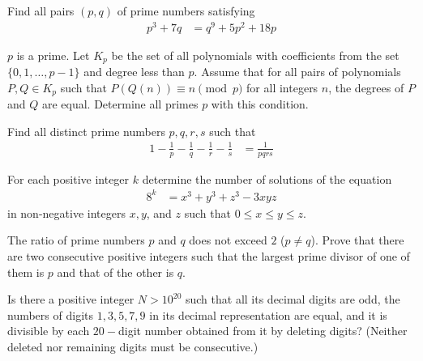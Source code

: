 \documentclass[problems.tex]{subfile}
\begin{document}
	\begin{problem}
		Find all pairs $(p, q)$ of prime numbers satisfying
			\begin{align*}
				p^3+7q
					& = q^9+5p^2+18p
			\end{align*}
	\end{problem}

	\begin{problem}
		$p$ is a prime. Let $K_p$ be the set of all polynomials with coefficients from the set $\{0,1,\dots ,p-1\}$ and degree less than $p$. Assume that for all pairs of polynomials $P,Q\in K_p$ such that $P(Q(n))\equiv n\pmod p$ for all integers $n$, the degrees of $P$ and $Q$ are equal. Determine all primes $p$ with this condition. %
	\end{problem}

	\begin{problem}
		Find all distinct prime numbers $p,q,r,s$ such that
			\begin{align*}
				1-\frac{1}{p} - \frac{1}{q} -\frac{1}{r} - \frac{1}{s}
					& =\frac{1}{pqrs}
			\end{align*}
	\end{problem}

	\begin{problem}
		For each positive integer $k$ determine the number of solutions of the equation
			\begin{align*}
				8^k
					& = x^3 + y^3 + z^3 - 3xyz
			\end{align*}
		in non-negative integers $x,y$, and $z$ such that $0 \leq x \leq y \leq z$.
	\end{problem}

	\begin{problem}
		The ratio of prime numbers $p$ and $q$ does not exceed $2$ ($p \neq q$). Prove
		that there are two consecutive positive integers such that the largest
		prime divisor of one of them is $p$ and that of the other is $q$.
	\end{problem}

	\begin{problem}
		Is there a positive integer $N > 10^{20}$ such that all its decimal digits
		are odd, the numbers of digits $1, 3, 5, 7, 9$ in its decimal representation
		are equal, and it is divisible by each $20-$digit number obtained from it by
		deleting digits? (Neither deleted nor remaining digits must be consecutive.)
	\end{problem}
\end{document}
